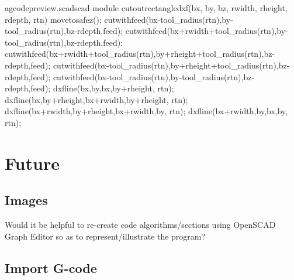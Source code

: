 \documentclass{ltxdoc}
\begin{document}
\lstset{firstnumber=\thegcpscad}
\begin{writecode}{a}{gcodepreview.scad}{scad}
module cutoutrectangledxf(bx, by, bz, rwidth, rheight, rdepth, rtn) {
  movetosafez();
  cutwithfeed(bx-tool_radius(rtn),by-tool_radius(rtn),bz-rdepth,feed);
  cutwithfeed(bx+rwidth+tool_radius(rtn),by-tool_radius(rtn),bz-rdepth,feed);
  cutwithfeed(bx+rwidth+tool_radius(rtn),by+rheight+tool_radius(rtn),bz-rdepth,feed);
  cutwithfeed(bx-tool_radius(rtn),by+rheight+tool_radius(rtn),bz-rdepth,feed);
  cutwithfeed(bx-tool_radius(rtn),by-tool_radius(rtn),bz-rdepth,feed);
  dxfline(bx,by,bx,by+rheight, rtn);
  dxfline(bx,by+rheight,bx+rwidth,by+rheight, rtn);
  dxfline(bx+rwidth,by+rheight,bx+rwidth,by, rtn);
  dxfline(bx+rwidth,by,bx,by, rtn);
}

\end{writecode}
\addtocounter{gcpscad}{13}

%
%
%

\section{Future}

\subsection*{Images}

Would it be helpful to re-create code algorithms/sections using OpenSCAD Graph Editor so as to represent/illustrate the program?

%

\subsection*{Import G-code}
\end{document}
